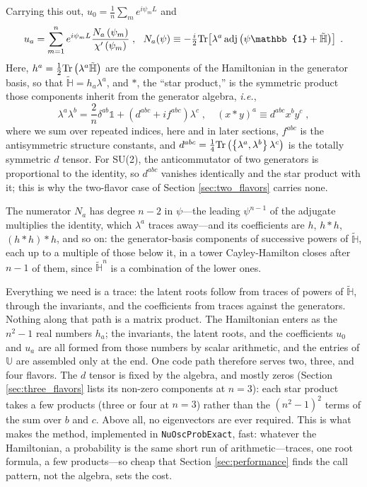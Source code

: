 \documentclass[final,5p,times,twocolumn,sort,compress]{elsarticle}
\newcommand{\ie}{{\it i.e.}}
\begin{document}
Carrying this out, $u_0 = \frac{1}{n}\sum_m e^{i\psi_m L}$ and
\begin{equation}
 \label{equ:ua_general}
 u_a
 =
 \sum_{m=1}^n e^{i\psi_m L}
 \frac{N_a\left(\psi_m\right)}{\chi^\prime\left(\psi_m\right)} \;,~~
 N_a(\psi) \equiv -\tfrac{i}{2}{\rm Tr}\!\left[\lambda^a\,{\rm adj}\left(\psi\mathbb{1}+\tilde{\mathbb{H}}\right)\right] \;.
\end{equation}
Here, $h^a = \frac{1}{2}{\rm Tr}\left(\lambda^a \tilde{\mathbb{H}}\right)$ are the components of the Hamiltonian in the generator basis, so that $\tilde{\mathbb{H}} = h_a \lambda^a$, and $\ast$, the ``star product,'' is the symmetric product those components inherit from the generator algebra, \ie,
\begin{equation}
 \label{equ:star}
 \lambda^a \lambda^b
 =
 \frac{2}{n} \delta^{ab} \mathbb{1}
 + \left(d^{abc} + i f^{abc}\right) \lambda^c \;,
 \quad
 \left(x \ast y\right)^a
 \equiv
 d^{abc} x^b y^c \;,
\end{equation}
where we sum over repeated indices, here and in later sections, $f^{abc}$ is the antisymmetric structure constants, and $d^{abc} = \frac{1}{4}{\rm Tr}\left(\left\{\lambda^a,\lambda^b\right\}\lambda^c\right)$ is the totally symmetric $d$ tensor.  For SU(2), the anticommutator of two generators is proportional to the identity, so $d^{abc}$ vanishes identically and the star product with it; this is why the two-flavor case of Section \ref{sec:two_flavors} carries none.

The numerator $N_a$ has degree $n-2$ in $\psi$---the leading $\psi^{n-1}$ of the adjugate multiplies the identity, which $\lambda^a$ traces away---and its coefficients are $h$, $h \ast h$, $\left(h \ast h\right) \ast h$, and so on: the generator-basis components of successive powers of $\tilde{\mathbb{H}}$, each up to a multiple of those below it, in a tower Cayley-Hamilton closes after $n-1$ of them, since $\tilde{\mathbb{H}}^n$ is a combination of the lower ones.

Everything we need is a trace: the latent roots follow from traces of powers of $\tilde{\mathbb{H}}$, through the invariants, and the coefficients from traces against the generators.  Nothing along that path is a matrix product.  The Hamiltonian enters as the $n^2-1$ real numbers $h_a$; the invariants, the latent roots, and the coefficients $u_0$ and $u_a$ are all formed from those numbers by scalar arithmetic, and the entries of $\mathbb{U}$ are assembled only at the end.  One code path therefore serves two, three, and four flavors.  The $d$ tensor is fixed by the algebra, and mostly zeros (Section \ref{sec:three_flavors} lists its non-zero components at $n=3$): each star product takes a few products (three or four at $n = 3$) rather than the $\left(n^2-1\right)^2$ terms of the sum over $b$ and $c$.  Above all, no eigenvectors are ever required.  This is what makes the method, implemented in {\tt NuOscProbExact}, fast: whatever the Hamiltonian, a probability is the same short run of arithmetic---traces, one root formula, a few products---so cheap that Section \ref{sec:performance} finds the call pattern, not the algebra, sets the cost.
\end{document}
